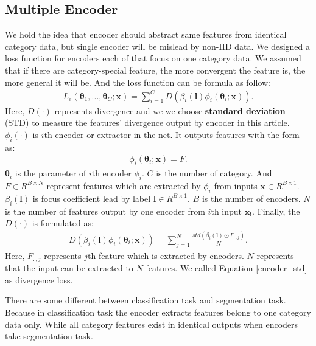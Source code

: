 \documentclass[journal]{IEEEtran}
\begin{document}
\subsection{Multiple Encoder}
We hold the idea that encoder should abstract same features from identical category data, but single encoder will be mislead by non-IID data. We designed a loss function for encoders each of that focus on one category data. We assumed that if there are category-special feature, the more convergent the feature is, the more general it will be. And the loss function can be formula as follow:
\begin{align}\label{encoder_std}
	L_{e}(\boldsymbol{\theta}_{1},...,\boldsymbol{\theta}_{C};\boldsymbol{x})=\sum_{i=1}^{C}D(\beta_{i}(\boldsymbol{l})\phi_{i}(\boldsymbol{\theta}_{i};\boldsymbol{x})) .
\end{align}
Here, $D(\cdot )$ represents divergence and we we choose \textbf{standard deviation} (STD) to measure the features' divergence output by encoder in this article. $\phi_{i}(\cdot)$ is $i$th encoder or extractor in the net. It outputs features with the form as:
\begin{align}\nonumber
	\phi_{i}(\boldsymbol{\theta}_{i};\boldsymbol{x})=F.
\end{align}
$\boldsymbol{\theta}_{i}$ is the parameter of $i$th encoder $\phi_{i}$. $C$ is the number of category. And $F \in R^{B\times N}$ represent features which are extracted by $\phi_{i}$ from inputs $\boldsymbol{x}\in R^{B\times 1}$. $\beta_{i}(\boldsymbol{l})$ is focus coefficient lead by label $\boldsymbol{l}\in R^{B\times 1}$. $B$ is the number of encoders. $N$ is the number of features output by one encoder from $i$th input $\boldsymbol{x_{i}}$. Finally, the $D(\cdot)$ is formulated as:
\begin{align}\label{classification_eloss}
	D(\beta_{i}(\boldsymbol{l})\phi_{i}(\boldsymbol{\theta}_{i};\boldsymbol{x}))=\sum_{j=1}^{N}\frac{std(\beta_{i}(\boldsymbol{l})\odot F_{:,j})}{N}.
\end{align}
Here, $F_{:,j}$ represents $j$th feature which is extracted by encoders. $N$ represents that the input can be extracted to $N$ features. We called Equation \ref{encoder_std} as divergence loss.

There are some different between classification task and segmentation task. Because in classification task the encoder extracts features belong to one category data only. While all category features exist in identical outputs when encoders take segmentation task.
\end{document}
